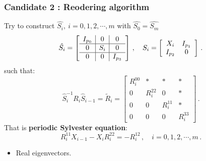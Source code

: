 \documentclass[mathserif, handout]{beamer}
\begin{document}
\begin{frame}[allowframebreaks]
  \frametitle{Candidate 2 : Reodering algorithm}

  Try to construct  $\hat{S_{i}},\:i=0,1,2,\cdots,m$ with
  $\hat{S_{0}}=\hat{S_{m}}$
  \[
  \hat{S_{i}}=
  \left[
    \begin{array}{c|c|c}
      I_{p_{0}} & 0 & 0  \\ \hline
      0 & S_{i} & 0 \\ \hline
      0 & 0 & I_{p_{3}}
    \end{array}
  \right]
  \,,
  \quad
  S_{i}=
  \left[
    \begin{array}{c c}
      X_{i} & I_{p_{1}} \\
      I_{p_{2}} & 0
    \end{array}
  \right]
  \,.
  \]
  such that:
  \[
  \hat{S}_{i}^{-1}R_{i}\hat{S}_{i-1}=\tilde{R}_{i}=
  \left[
    \begin{array}{c|cc|c}
      R^{00}_{i} & * & *& * \\ \hline
      0 & R^{22}_{i} & 0 & * \\
      0 & 0 & R^{11}_{i} & * \\ \hline
      0 & 0 & 0 & R^{33}_{i}
    \end{array}
  \right]
  \,.
  \]
  That is
 {\color{red} \textbf{periodic Sylvester equation}}:
  \begin{equation}
    \label{eq:xdpse}
    R^{11}_{i}X_{i-1}-X_{i}R^{22}_{i}=-R^{12}_{i}
    \,,\quad i=0,1,2,\cdots,m
    \,.
  \end{equation}



  \begin{itemize}
  \item Real eigenvectors.


\end{itemize}
\end{frame}
\end{document}
